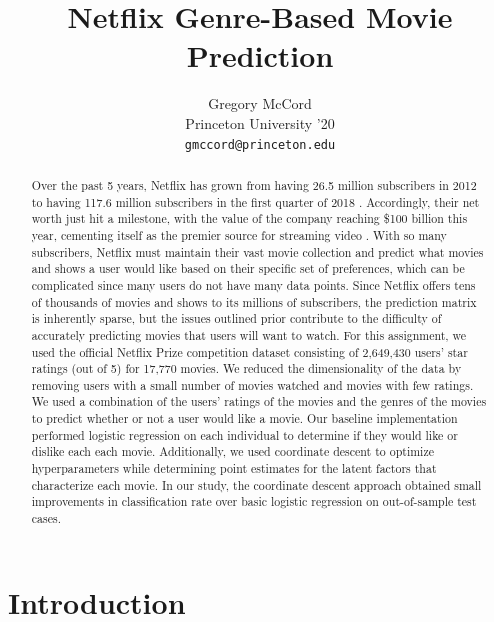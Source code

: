 \documentclass{article} %
\title{Netflix Genre-Based Movie Prediction}
\author{
Gregory McCord\\
Princeton University '20\\
\texttt{gmccord@princeton.edu} \\
}
\begin{document}
\maketitle

\begin{abstract}

Over the past 5 years, Netflix has grown from having 26.5 million subscribers in 2012 to having 117.6 million subscribers in the first quarter of 2018 \cite{view}. Accordingly, their net worth just hit a milestone, with the value of the company reaching \$100 billion this year, cementing itself as the premier source for streaming video \cite{money}. With so many subscribers, Netflix must maintain their vast movie collection and predict what movies and shows a user would like based on their specific set of preferences, which can be complicated since many users do not have many data points. Since Netflix offers tens of thousands of movies and shows to its millions of subscribers, the prediction matrix is inherently sparse, but the issues outlined prior contribute to the difficulty of accurately predicting movies that users will want to watch. For this assignment, we used the official Netflix Prize competition dataset consisting of 2,649,430 users' star ratings (out of 5) for 17,770 movies. We reduced the dimensionality of the data by removing users with a small number of movies watched and movies with few ratings. We used a combination of the users' ratings of the movies and the genres of the movies to predict whether or not a user would like a movie. Our baseline implementation performed logistic regression on each individual to determine if they would like or dislike each each movie. Additionally, we used coordinate descent to optimize hyperparameters while determining point estimates for the latent factors that characterize each movie. In our study, the coordinate descent approach obtained small improvements in classification rate over basic logistic regression on out-of-sample test cases.

\end{abstract}

\section{Introduction}
\end{document}
